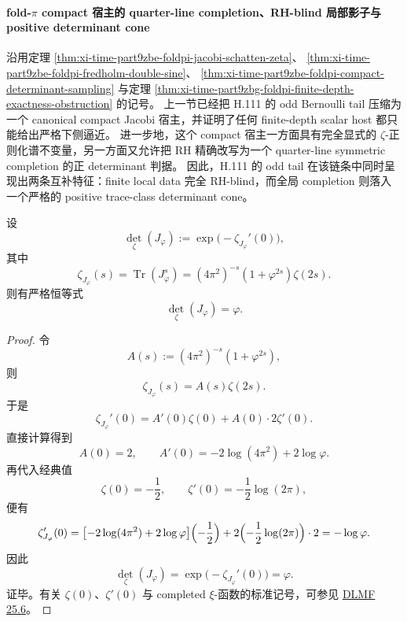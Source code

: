 \paragraph{fold-\texorpdfstring{$\pi$}{pi} compact 宿主的 quarter-line completion、RH-blind 局部影子与 positive determinant cone}
沿用定理 \ref{thm:xi-time-part9zbe-foldpi-jacobi-schatten-zeta}、
\ref{thm:xi-time-part9zbe-foldpi-fredholm-double-sine}、
\ref{thm:xi-time-part9zbe-foldpi-compact-determinant-sampling}
与定理 \ref{thm:xi-time-part9zbg-foldpi-finite-depth-exactness-obstruction} 的记号。
上一节已经把 H.111 的 odd Bernoulli tail 压缩为一个 canonical compact Jacobi 宿主，并证明了任何 finite-depth scalar host 都只能给出严格下侧逼近。
进一步地，这个 compact 宿主一方面具有完全显式的 \(\zeta\)-正则化谱不变量，另一方面又允许把 RH 精确改写为一个 quarter-line symmetric completion 的正 determinant 判据。
因此，H.111 的 odd tail 在该链条中同时呈现出两条互补特征：finite local data 完全 RH-blind，而全局 completion 则落入一个严格的 positive trace-class determinant cone。

\begin{theorem}\label{thm:xi-time-part9zbh-foldpi-zeta-regularized-determinant}
设
\[
\det_\zeta(J_\varphi):=\exp\!\bigl(-\zeta_{J_\varphi}'(0)\bigr),
\]
其中
\[
\zeta_{J_\varphi}(s)=\operatorname{Tr}(J_\varphi^s)
=(4\pi^2)^{-s}(1+\varphi^{2s})\zeta(2s).
\]
则有严格恒等式
\[
\det_\zeta(J_\varphi)=\varphi.
\]
\end{theorem}
\begin{proof}
令
\[
A(s):=(4\pi^2)^{-s}(1+\varphi^{2s}),
\]
则
\[
\zeta_{J_\varphi}(s)=A(s)\zeta(2s).
\]
于是
\[
\zeta_{J_\varphi}'(0)
=
A'(0)\zeta(0)+A(0)\cdot 2\zeta'(0).
\]
直接计算得到
\[
A(0)=2,
\qquad
A'(0)=-2\log(4\pi^2)+2\log\varphi.
\]
再代入经典值
\[
\zeta(0)=-\frac12,
\qquad
\zeta'(0)=-\frac12\log(2\pi),
\]
便有
\[
\zeta_{J_\varphi}'(0)
=
\bigl[-2\log(4\pi^2)+2\log\varphi\bigr]\Bigl(-\frac12\Bigr)
+2\Bigl(-\frac12\log(2\pi)\Bigr)\cdot 2
=
-\log\varphi.
\]
因此
\[
\det_\zeta(J_\varphi)
=
\exp\!\bigl(-\zeta_{J_\varphi}'(0)\bigr)
=
\varphi.
\]
证毕。有关 \(\zeta(0)\)、\(\zeta'(0)\) 与 completed \(\xi\)-函数的标准记号，可参见 \href{https://dlmf.nist.gov/25.6}{DLMF 25.6}。
\end{proof}


